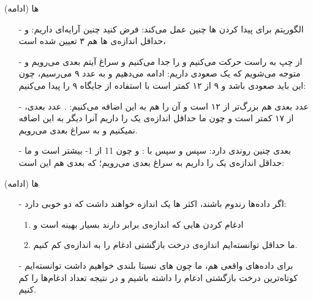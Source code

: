 \begin{frame}{ها (ادامه)}
\begin{itemize}\itemr
\item[-]
الگوریتم برای پیدا کردن ها چنین عمل می‌کند: فرض کنید چنین آرایه‌ای داریم:
\m{\left[8, 12, 9, 17, 15, -1, 22, 11, 10, 7\right]}
و حداقل اندازه‌ی ها هم ۳ تعیین شده است،

\item[-]
از چپ به راست حرکت می‌کنیم و 
\m{\left[8\right]}
را جدا می‌کنیم و سراغ آیتم بعدی می‌رویم و متوجه می‌شویم که یک  صعودی داریم:
\m{\left[8, 12\right]}
ادامه ‌می‌دهیم و به عدد ۹ می‌رسیم، چون این  باید صعودی باشد و ۹ از ۱۲ کمتر است با استفاده از  جایگاه ۹ را پیدا می‌کنیم:
\m{\left[8, 9, 12\right]}

\item[-]
عدد بعدی هم بزرگ‌تر از ۱۲ است و آن را هم به این  اضافه می‌کنیم:
\m{\left[8, 9, 12, 17\right]}.
عدد بعدی، از ۱۷ کمتر است و چون ما حداقل اندازه‌ی یک  را داریم آنرا دیگر به این  اضافه نمیکنیم و به سراغ  بعدی می‌رویم.

\item[-]
 بعدی چنین روندی دارد:
\m{\left[15\right]}
سپس 
\m{\left[15, -1\right]}
و سپس با :
\m{\left[22, 15, -1\right]}
و چون 11 از 1- بیشتر است و ما حداقل اندازه‌ی یک  را داریم به سراغ  بعدی می‌رویم؛ که  بعدی هم این است:
\m{\left[11, 10, 7\right]}
\end{itemize}
\end{frame}

\begin{frame}{ها (ادامه)}
\begin{itemize}\itemr
\item[-]
اگر داده‌ها رندوم باشند، اکثر ها یک اندازه خواهند داشت که دو خوبی دارد:
\begin{enumerate}\itemr
\item 
ادغام کردن هایی که اندازه‌ی برابر دارند بسیار بهینه است و
\item 
ما حداقل توانسته‌ایم اندازه‌ی درخت بازگشتی ادغام را به اندازه‌ی 
کم کنیم.
\end{enumerate}

\item[-]
برای داده‌های واقعی هم، ما چون های نسبتا بلندی خواهیم داشت توانسته‌ایم کوتاه‌ترین درخت بازگشتی ادغام را داشته باشیم و در نتیجه تعداد ادغام‌ها را کم کنیم.
\end{itemize}
\end{frame}

